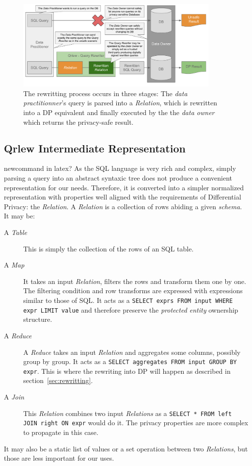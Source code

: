 \documentclass[letterpaper]{article} %
\begin{document}
\begin{figure}[t]
    \centering
    \includegraphics[width=0.9\textwidth]{figures/Qrlew - process} %
    \caption{The rewritting process occurs in three stages: The \emph{data practitionner}'s query is parsed into a \emph{Relation}, which is rewritten into a DP equivalent and finally executed by the the \emph{data owner} which returns the privacy-safe result.}
    \label{fig:process}
\end{figure}

\subsection{Qrlew Intermediate Representation}

newcommand in latex?
As the SQL language is very rich and complex, simply parsing a query into an abstract syntaxic tree does not produce a convenient representation for our needs. Therefore, it is converted into a simpler normalized representation with properties well aligned with the requirements of Differential Privacy: the \emph{Relation}. A \emph{Relation} is a collection of rows abiding a given \emph{schema}. It may be:
\begin{description}
    \item[A \emph{Table}] This is simply the collection of the rows of an SQL table.
    \item[A \emph{Map}] It takes an input \emph{Relation}, filters the rows and transform them one by one. The filtering condition and row transforms are expressed with expressions similar to those of SQL. It acts as a \texttt{SELECT exprs FROM input WHERE expr LIMIT value} and therefore preserve the \emph{protected entity} ownership structure.
    \item[A \emph{Reduce}] A \emph{Reduce} takes an input \emph{Relation} and aggregates some columns, possibly group by group. It acts as a \texttt{SELECT aggregates FROM input GROUP BY expr}. This is where the rewriting into DP will happen as described in section~\ref{sec:rewritting}.
    \item[A \emph{Join}] This \emph{Relation} combines two input \emph{Relations} as a \texttt{SELECT * FROM left JOIN right ON expr} would do it. The privacy properties are more complex to propagate in this case.
\end{description}
It may also be a static list of values or a set operation between two \emph{Relations}, but those are less important for our uses.
\end{document}
